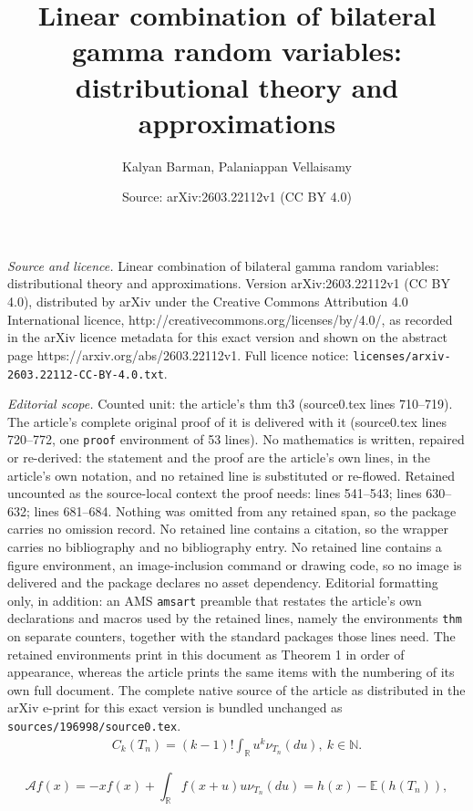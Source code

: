 \documentclass[10pt,a4paper]{amsart}
\title{Linear combination of bilateral gamma random variables: distributional theory and approximations}
\author{Kalyan Barman, Palaniappan Vellaisamy}
\date{Source: arXiv:2603.22112v1 (CC BY 4.0)}
\begin{document}
\maketitle

\noindent\emph{Source and licence.} Linear combination of bilateral gamma random variables: distributional theory and approximations. Version arXiv:2603.22112v1 (CC BY 4.0), distributed by arXiv under the Creative Commons Attribution 4.0 International licence, http://creativecommons.org/licenses/by/4.0/, as recorded in the arXiv licence metadata for this exact version and shown on the abstract page https://arxiv.org/abs/2603.22112v1. Full licence notice: \texttt{licenses/arxiv-2603.22112-CC-BY-4.0.txt}.\par\smallskip

\noindent\textit{Editorial scope.} Counted unit: the article's thm th3 (source0.tex lines 710--719). The article's complete original proof of it is delivered with it (source0.tex lines 720--772, one \texttt{proof} environment of 53 lines). No mathematics is written, repaired or re-derived: the statement and the proof are the article's own lines, in the article's own notation, and no retained line is substituted or re-flowed.  Retained uncounted as the source-local context the proof needs: lines 541--543; lines 630--632; lines 681--684.  Nothing was omitted from any retained span, so the package carries no omission record.  No retained line contains a citation, so the wrapper carries no bibliography and no bibliography entry.  No retained line contains a figure environment, an image-inclusion command or drawing code, so no image is delivered and the package declares no asset dependency.  Editorial formatting only, in addition: an AMS \texttt{amsart} preamble that restates the article's own declarations and macros used by the retained lines, namely the environments \texttt{thm} on separate counters, together with the standard packages those lines need.  The retained environments print in this document as Theorem 1 in order of appearance, whereas the article prints the same items with the numbering of its own full document.  The complete native source of the article as distributed in the arXiv e-print for this exact version is bundled unchanged as \texttt{sources/196998/source0.tex}.
\begin{align}\label{cumu}
	C_k(T_n)=(k-1)! \int_{\mathbb{{R}}}u^{k}\nu_{T_n}(du),~k\in\mathbb{N}.
\end{align} 

\begin{equation}\label{PP2:e15}
\mathcal{A}f(x)=-xf(x)+\displaystyle\int_{\mathbb{R}}f(x+u)u\nu_{T_n}(du)= h(x)-\mathbb{E}(h(T_n)),
\end{equation}
\end{document}
